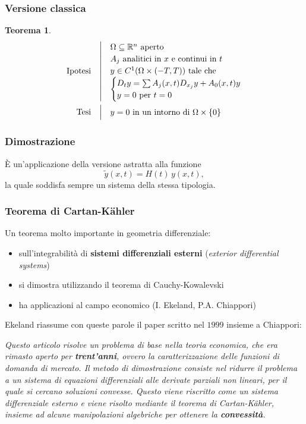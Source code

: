 \documentclass[serif,notheorems]{beamer}
\makeatletter
\newenvironment{ipotesi}%
{\quad\left|\quad\def\arraystretch{1.2}\begin{array}{@{}l@{}}}%
{\end{array}\right.}
\newcommand{\hpth}[2]
{
\begin{align*}
\quad
\text{Ipotesi}
&\begin{ipotesi}
#1
\end{ipotesi}\\
\text{Tesi}
&\begin{ipotesi}
#2
\end{ipotesi}
\end{align*}
}
\theoremstyle{definition} %
\newtheorem{theorem}{Teorema}[section] %
\theoremstyle{remark}
\makeatother
\begin{document}
\begin{frame}
\frametitle{Versione classica}
\begin{theorem}
\hpth{
\Omega \subseteq \mathbb{R}^n \text{ aperto}\\
A_j \text{ analitici in } x \text{ e continui in } t\\
y\in C^1 (\Omega \times (-T,T))  \text{ tale che} \\ 
\begin{cases}
D_t y = \sum A_j (x,t) D_{x_j}y+A_0(x,t)y \\
y=0 \text{ per } t=0
\end{cases} \\
}{
y = 0 \text{ in un intorno di } \Omega \times \{ 0\}
}
\end{theorem}
\end{frame}

\begin{frame}
\frametitle{Dimostrazione}
È un'applicazione della versione astratta alla funzione $$\widetilde{y}(x,t) = H(t) \, y(x,t),$$ 
la quale soddisfa sempre un sistema della stessa tipologia.
\end{frame}

\begin{frame}
\frametitle{Teorema di Cartan-Kähler}
Un teorema molto importante in geometria differenziale:
\begin{itemize}
\item sull'integrabilità di \textbf{sistemi differenziali esterni} (\textit{exterior differential systems})
\item si dimostra utilizzando il teorema di Cauchy-Kowalevski
\item ha applicazioni al campo economico (I. Ekeland, P.A. Chiappori)
\end{itemize}
\end{frame}

\begin{frame}
Ekeland riassume con queste parole il paper scritto nel $1999$ insieme a Chiappori:\\
\begin{center}
\textit{Questo articolo risolve un problema di base nella teoria economica, che era rimasto aperto per \textbf{trent'anni}, ovvero la caratterizzazione delle funzioni di domanda di mercato. Il metodo di dimostrazione consiste nel ridurre il problema a un sistema di equazioni differenziali alle derivate parziali non lineari, per il quale si cercano soluzioni convesse. Questo viene riscritto come un sistema differenziale esterno e viene risolto mediante il teorema di Cartan-Kähler, insieme ad alcune manipolazioni algebriche per ottenere la \textbf{convessità}.}
\end{center}
\end{frame}
\end{document}
